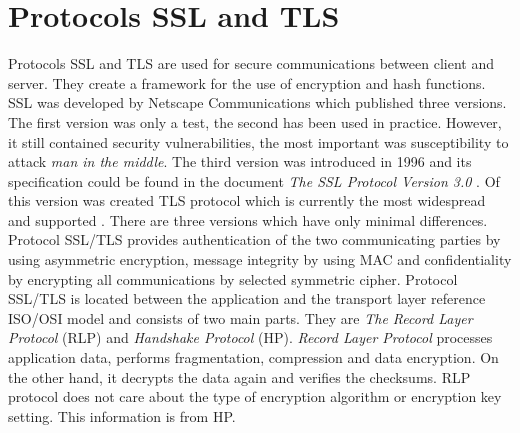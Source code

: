 \documentclass[
  digital, %
  notable,   %
  lof,     %
  lot,     %
]{fithesis3}
\begin{document}
\section{Protocols SSL and TLS}
Protocols SSL and TLS are used for secure communications between client and server. They 
create a framework for the use of encryption and hash functions.
\vskip0.2in
SSL was developed by Netscape Communications which published three versions. The first version 
was only a test, the second has been used in practice. However, it still contained security 
vulnerabilities, the most important was susceptibility to attack \textit{man in the middle}. %
The third version was introduced in 1996 and its specification could be found in the document \textit{The SSL Protocol Version 3.0} \cite{freier2011secure}. Of this version was created TLS protocol which is currently the most widespread and supported \cite{oppliger2003security}. There are three versions which have only minimal differences.
\vskip0.2in
Protocol SSL/TLS provides authentication of the two communicating parties by using asymmetric 
encryption, message integrity by using MAC and confidentiality by encrypting all communications 
by selected symmetric cipher.
\vskip0.2in
Protocol SSL/TLS is located between the application and the transport layer reference ISO/OSI 
model and consists of two main parts. They are \textit{The Record Layer Protocol} (RLP) and 
\textit{Handshake Protocol} (HP). %
\vskip0.2in
\textit{Record Layer Protocol} processes application data, performs fragmentation, compression 
and data encryption. On the other hand, it decrypts the data again and verifies the checksums. 
RLP protocol does not care about the type of encryption algorithm or encryption key setting. 
This information is from HP.
\end{document}
